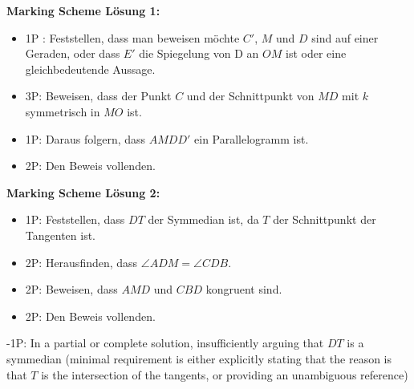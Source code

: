 \textbf{Marking Scheme Lösung 1:}
\begin{itemize}
    \item 1P : Feststellen, dass man beweisen möchte $C'$, $M$ und $D$ sind auf einer Geraden, oder dass $E'$ die Spiegelung von D an $OM$ ist oder eine gleichbedeutende Aussage.
    \item 3P: Beweisen, dass der Punkt $C$ und der Schnittpunkt von $MD$ mit $k$ symmetrisch in $MO$ ist.
    \item 1P: Daraus folgern, dass $AMDD'$ ein Parallelogramm ist.
    \item 2P: Den Beweis vollenden. 
\end{itemize}
 \textbf{Marking Scheme Lösung 2:}
 \begin{itemize}
     \item 1P: Feststellen, dass $DT$ der Symmedian ist, da $T$ der Schnittpunkt der Tangenten ist.
     \item 2P: Herausfinden, dass $\angle ADM = \angle CDB$.
     \item 2P: Beweisen, dass $AMD$ und $CBD$ kongruent sind. 
     \item 2P: Den Beweis vollenden. 
 \end{itemize}
 -1P: In a partial or complete solution, insufficiently arguing that $DT$ is a symmedian (minimal requirement is either explicitly stating that the reason is that $T$ is the intersection of the tangents, or providing an unambiguous reference)






